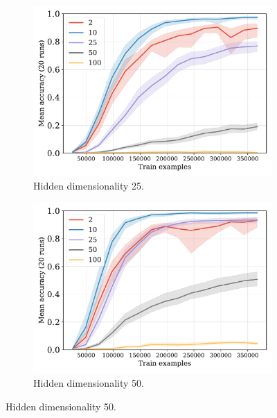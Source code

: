 \documentclass[12pt]{article}
\begin{document}
\begin{figure}[H]
  \begin{subfigure}{0.45\linewidth}
    \includegraphics[width=1\textwidth]{fig/fuzzy-lm-vocab50-train_size-embed_dim-hidden_dim=25.pdf}
    \caption{Hidden dimensionality 25.}
  \end{subfigure}
  \hfill
  \begin{subfigure}{0.45\linewidth}
    \includegraphics[width=1\textwidth]{fig/fuzzy-lm-vocab50-train_size-embed_dim-hidden_dim=50.pdf}
    \caption{Hidden dimensionality 50.}
  \end{subfigure}


\end{figure}
\end{document}

